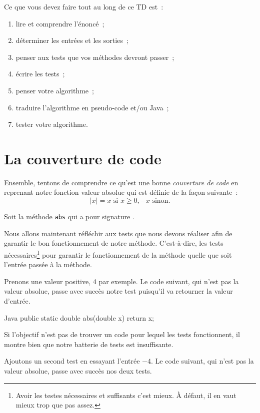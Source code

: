 \documentclass[a4paper,11pt]{article}
\begin{document}
	Ce que vous devez faire tout au long de ce TD est~:
	\begin{enumerate}
		\item lire et comprendre l'énoncé~;
		\item déterminer les entrées et les sorties~;
		\item penser aux tests que vos méthodes devront passer~;
		\item écrire les tests~;
		\item penser votre algorithme~;
		\item traduire l'algorithme en pseudo-code et/ou Java~;
		\item tester votre algorithme.
	\end{enumerate}


\section{La couverture de code}

	Ensemble, tentons de comprendre ce qu'est une bonne \emph{couverture de code} en reprenant notre fonction valeur absolue qui est définie de la façon suivante~:
	$$
		|x| = x \textrm{ si } x \geq 0, -x \textrm{ sinon}.
	$$

	Soit la méthode \texttt{abs} qui a pour signature .

	Nous allons maintenant réfléchir aux tests que nous devons réaliser afin de garantir le bon fonctionnement de notre méthode. C'est-à-dire, les tests nécessaires\footnote{Avoir les testes nécessaires et suffisants c'est mieux. À défaut, il en vaut mieux trop que pas assez.} pour garantir le fonctionnement de la méthode quelle que soit l'entrée passée à la méthode.

	Prenons une valeur positive, 4 par exemple. Le code suivant, qui n'est pas la valeur absolue, passe avec succès notre test puisqu'il va retourner la valeur d'entrée.
	\begin{Code}{Java}
		public static double abs(double x) {
			return x;
		}
	\end{Code}


	Si l'objectif n'est pas de trouver un code pour lequel les tests fonctionnent, il montre bien que notre batterie de tests est insuffisante.

	Ajoutons un second test en essayant l'entrée $-4$. Le code suivant, qui n'est pas la valeur absolue, passe avec succès nos deux tests. 
\end{document}
